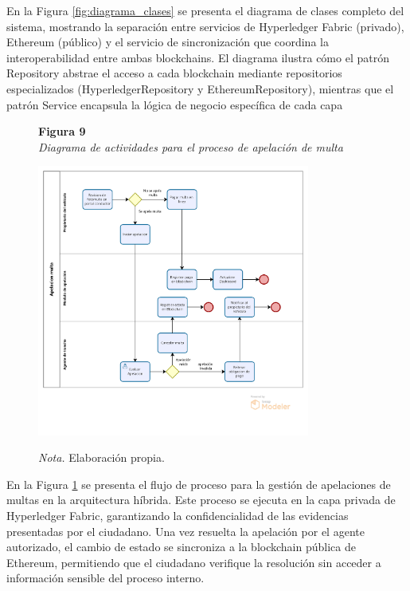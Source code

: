 En la Figura \ref{fig:diagrama_clases} se presenta el diagrama de clases completo del sistema, mostrando la separación entre servicios de Hyperledger Fabric (privado), Ethereum (público) y el servicio de sincronización que coordina la interoperabilidad entre ambas blockchains. El diagrama ilustra cómo el patrón Repository abstrae el acceso a cada blockchain mediante repositorios especializados (HyperledgerRepository y EthereumRepository), mientras que el patrón Service encapsula la lógica de negocio específica de cada capa
 \begin{figure}[htbp]
    \begin{flushleft}
        \textbf{Figura 9}\\[2em]
        \textit{Diagrama de actividades para el proceso de apelación de multa}
    \end{flushleft}
    \vspace{1em}
    \centering
    \includegraphics[width=0.8\textwidth]{Images/ActApelacion.png}
    \vspace{2em}
    \begin{flushleft}
        \textit{Nota.} Elaboración propia.
    \end{flushleft}
    \label{fig:diagrama_apelacion}
\end{figure}

En la Figura \ref{fig:diagrama_apelacion} se presenta el flujo de proceso para la gestión de apelaciones de multas en la arquitectura híbrida. Este proceso se ejecuta en la capa privada de Hyperledger Fabric, garantizando la confidencialidad de las evidencias presentadas por el ciudadano. Una vez resuelta la apelación por el agente autorizado, el cambio de estado se sincroniza a la blockchain pública de Ethereum, permitiendo que el ciudadano verifique la resolución sin acceder a información sensible del proceso interno.

